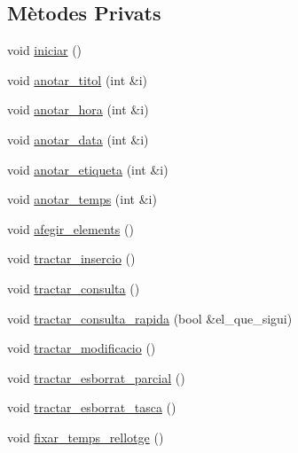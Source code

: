 \subsection*{Mètodes Privats}
\begin{DoxyCompactItemize}
\item 
void \hyperlink{class_comanda_a57a4df9cbf2f41ebbd36270f867e8694}{iniciar} ()
\item 
void \hyperlink{class_comanda_a97ba2fd8c8b5a6d8007efdbfbbcb3fae}{anotar\+\_\+titol} (int \&i)
\item 
void \hyperlink{class_comanda_a0a5bbe87d1bc18bb46b303d167c1794a}{anotar\+\_\+hora} (int \&i)
\item 
void \hyperlink{class_comanda_a77134aa747d804e8d62aba6f2e443eec}{anotar\+\_\+data} (int \&i)
\item 
void \hyperlink{class_comanda_acd79aaef42e1df67426e92b588c793f6}{anotar\+\_\+etiqueta} (int \&i)
\item 
void \hyperlink{class_comanda_a32cf8807dce80ccd10b23d3c420be570}{anotar\+\_\+temps} (int \&i)
\item 
void \hyperlink{class_comanda_a6394f34d947899ee711c598ad65882c5}{afegir\+\_\+elements} ()
\item 
void \hyperlink{class_comanda_a2d6b1de1d935c3441b854165a30b6992}{tractar\+\_\+insercio} ()
\item 
void \hyperlink{class_comanda_afdfd9d24c135a173a87e3f6a406358d7}{tractar\+\_\+consulta} ()
\item 
void \hyperlink{class_comanda_ae431b547161b575907fb0a093b0741bb}{tractar\+\_\+consulta\+\_\+rapida} (bool \&el\+\_\+que\+\_\+sigui)
\item 
void \hyperlink{class_comanda_ad217f019b2d65827a0dba40729311cff}{tractar\+\_\+modificacio} ()
\item 
void \hyperlink{class_comanda_a6b70b1eafbfc69798994a5c23d3885b9}{tractar\+\_\+esborrat\+\_\+parcial} ()
\item 
void \hyperlink{class_comanda_ac453d63201eed34d7c0570e257e6bee4}{tractar\+\_\+esborrat\+\_\+tasca} ()
\item 
void \hyperlink{class_comanda_a421912bd32984118974509a8620f8923}{fixar\+\_\+temps\+\_\+rellotge} ()
\end{DoxyCompactItemize}
